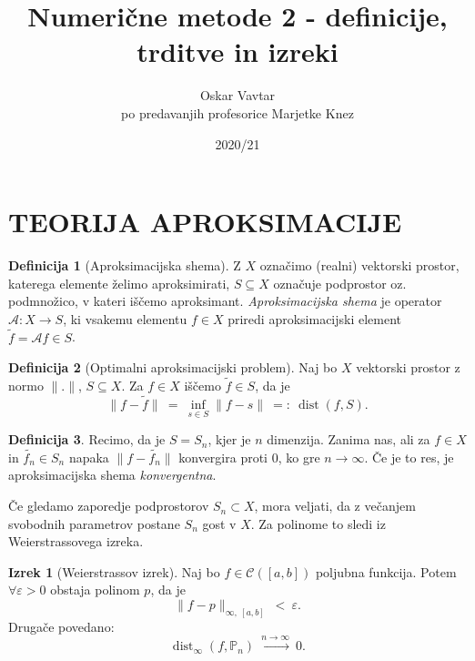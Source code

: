 \documentclass[11pt]{article}
\title{Numerične metode 2 - definicije, trditve in izreki}
\author{Oskar Vavtar \\
po predavanjih profesorice Marjetke Knez}
\date{2020/21}
\DeclareMathOperator{\dist}{dist}
\newcommand{\p}{\mathbb{P}}
\newcommand{\A}{\mathcal{A}}
\newcommand{\C}{\mathcal{C}}
\theoremstyle{definition}
\newtheorem{definicija}{Definicija}[section]
\theoremstyle{definition}
\newtheorem{izrek}{Izrek}
\begin{document}
\maketitle
\pagebreak
\tableofcontents
\pagebreak


\section{TEORIJA APROKSIMACIJE}
\vspace{0.5cm}

\begin{definicija}[Aproksimacijska shema]

Z $X$ označimo (realni) vektorski prostor, katerega elemente želimo aproksimirati, $S \subseteq X$ označuje podprostor oz. podmnožico, v kateri iščemo aproksimant. \textit{Aproksimacijska shema} je operator $\A: X \rightarrow S$, ki vsakemu elementu $f \in X$ priredi aproksimacijski element $\tilde{f} = \A f \in S$.

\end{definicija}
\vspace{0.5cm}

\begin{definicija}[Optimalni aproksimacijski problem]

Naj bo $X$ vektorski prostor z normo $\|.\|$, $S \subseteq X$. Za $f \in X$ iščemo $\tilde{f} \in S$, da je 
$$\|f - \tilde{f}\| ~=~ \inf_{s \in S}{\|f - s\|} ~=:~ \dist(f, S).$$

\end{definicija}
\vspace{0.5cm}

\begin{definicija}

Recimo, da je $S = S_n$, kjer je $n$ dimenzija. Zanima nas, ali za $f \in X$ in $\tilde{f_n} \in S_n$ napaka $\|f - \tilde{f_n}\|$ konvergira proti $0$, ko gre $n \rightarrow \infty$. Če je to res, je aproksimacijska shema \textit{konvergentna}.

Če gledamo zaporedje podprostorov $S_n \subset X$, mora veljati, da z večanjem svobodnih parametrov postane $S_n$ gost v $X$. Za polinome to sledi iz Weierstrassovega izreka.

\end{definicija}
\vspace{0.5cm}

\begin{izrek}[Weierstrassov izrek]

Naj bo $f \in \C([a, b])$ poljubna funkcija. Potem $\forall \varepsilon > 0$ obstaja polinom $p$, da je 
$$\|f - p\|_{\infty,~[a, b]} ~<~ \varepsilon.$$
Drugače povedano:
$$\dist_{\infty}(f, \p_n) ~\xrightarrow{n \rightarrow \infty}~ 0.$$

\end{izrek}
\vspace{0.5cm}
\end{document}
